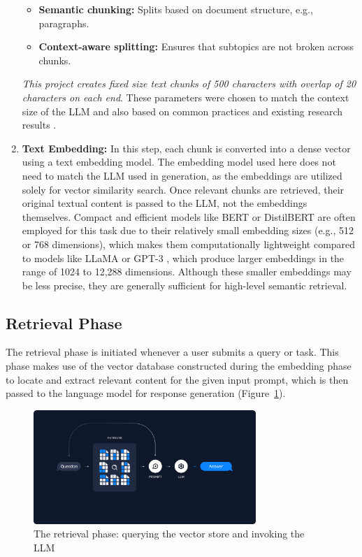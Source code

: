 \begin{enumerate}[label=\alph*.]
\begin{itemize}
    \item \textbf{Semantic chunking:} Splits based on document structure, e.g., paragraphs.
    \item \textbf{Context-aware splitting:} Ensures that subtopics are not broken across chunks.
  \end{itemize}
  \textit{This project creates fixed size text chunks of 500 characters with overlap of 20 characters on each end}. These parameters were chosen to match the context size of the LLM and also based on common practices and existing research results \cite{wang2024bestpractices}.

  
  \item \textbf{Text Embedding:} In this step, each chunk is converted into a dense vector using a text embedding model. The embedding model used here does not need to match the LLM used in generation, as the embeddings are utilized solely for vector similarity search. Once relevant chunks are retrieved, their original textual content is passed to the LLM, not the embeddings themselves. Compact and efficient models like BERT or DistilBERT are often employed for this task due to their relatively small embedding sizes (e.g., 512 or 768 dimensions), which makes them computationally lightweight compared to models like LLaMA \cite{touvron2023llama} or GPT-3 \cite{brown2020language}, which produce larger embeddings in the range of 1024 to 12,288 dimensions. Although these smaller embeddings may be less precise, they are generally sufficient for high-level semantic retrieval.
\end{enumerate}

\subsection{Retrieval Phase}
\label{subsec:RetrievalPhase}

The retrieval phase is initiated whenever a user submits a query or task. This phase makes use of the vector database constructed during the embedding phase to locate and extract relevant content for the given input prompt, which is then passed to the language model for response generation (Figure~\ref{fig:retrieval_phase}).



\begin{figure}[h]
    \centering
    \includegraphics[width=0.75\textwidth]{images/lagchain-rag-retrieval.png}
    \caption{The retrieval phase: querying the vector store and invoking the LLM~\cite{langchain_rag}}
    \label{fig:retrieval_phase}
\end{figure}

